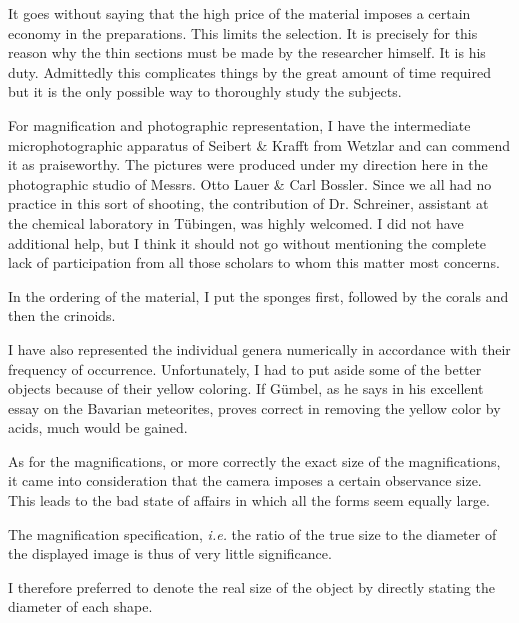 \documentclass[a4paper, 12pt, oneside]{article}
\begin{document}
It goes without saying that the high price of the material imposes a certain economy in the preparations. This limits the selection. It is precisely for this reason why the thin sections must be made by the researcher himself. It is his duty. Admittedly this complicates things by the great amount of time required but it is the only possible way to thoroughly study the subjects.

For magnification and photographic representation, I have the intermediate microphotographic apparatus of Seibert \& Krafft from Wetzlar and can commend it as praiseworthy. The pictures were produced under my direction here in the photographic studio of Messrs. Otto Lauer \& Carl Bossler. Since we all had no practice in this sort of shooting, the contribution of Dr. Schreiner, assistant at the chemical laboratory in Tübingen, was highly welcomed. I did not have additional help, but I think it should not go without mentioning the complete lack of participation from all those scholars to whom this matter most concerns.

In the ordering of the material, I put the sponges first, followed by the corals and then the crinoids.

I have also represented the individual genera numerically in accordance with their frequency of occurrence. Unfortunately, I had to put aside some of the better objects because of their yellow coloring. If Gümbel, as he says in his excellent essay on the Bavarian meteorites, proves correct in removing the yellow color by acids, much would be gained.

As for the magnifications, or more correctly the exact size of the magnifications, it came into consideration that the camera imposes a certain observance size. This leads to the bad state of affairs in which all the forms seem equally large.

The magnification specification, \emph{i.e.} the ratio of the true size to the diameter of the displayed image is thus of very little significance.

I therefore preferred to denote the real size of the object by directly stating the diameter of each shape.
\clearpage
\end{document}

